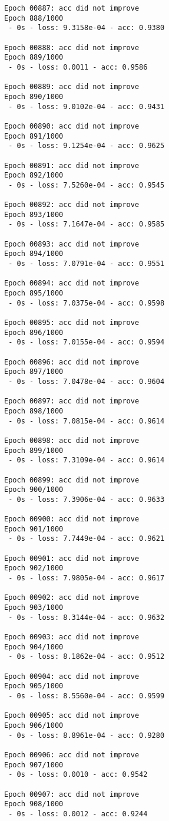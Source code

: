 \documentclass[11pt]{article}
\begin{document}
\begin{Verbatim}[commandchars=\\\{\}]
Epoch 00887: acc did not improve
Epoch 888/1000
 - 0s - loss: 9.3158e-04 - acc: 0.9380

Epoch 00888: acc did not improve
Epoch 889/1000
 - 0s - loss: 0.0011 - acc: 0.9586

Epoch 00889: acc did not improve
Epoch 890/1000
 - 0s - loss: 9.0102e-04 - acc: 0.9431

Epoch 00890: acc did not improve
Epoch 891/1000
 - 0s - loss: 9.1254e-04 - acc: 0.9625

Epoch 00891: acc did not improve
Epoch 892/1000
 - 0s - loss: 7.5260e-04 - acc: 0.9545

Epoch 00892: acc did not improve
Epoch 893/1000
 - 0s - loss: 7.1647e-04 - acc: 0.9585

Epoch 00893: acc did not improve
Epoch 894/1000
 - 0s - loss: 7.0791e-04 - acc: 0.9551

Epoch 00894: acc did not improve
Epoch 895/1000
 - 0s - loss: 7.0375e-04 - acc: 0.9598

Epoch 00895: acc did not improve
Epoch 896/1000
 - 0s - loss: 7.0155e-04 - acc: 0.9594

Epoch 00896: acc did not improve
Epoch 897/1000
 - 0s - loss: 7.0478e-04 - acc: 0.9604

Epoch 00897: acc did not improve
Epoch 898/1000
 - 0s - loss: 7.0815e-04 - acc: 0.9614

Epoch 00898: acc did not improve
Epoch 899/1000
 - 0s - loss: 7.3109e-04 - acc: 0.9614

Epoch 00899: acc did not improve
Epoch 900/1000
 - 0s - loss: 7.3906e-04 - acc: 0.9633

Epoch 00900: acc did not improve
Epoch 901/1000
 - 0s - loss: 7.7449e-04 - acc: 0.9621

Epoch 00901: acc did not improve
Epoch 902/1000
 - 0s - loss: 7.9805e-04 - acc: 0.9617

Epoch 00902: acc did not improve
Epoch 903/1000
 - 0s - loss: 8.3144e-04 - acc: 0.9632

Epoch 00903: acc did not improve
Epoch 904/1000
 - 0s - loss: 8.1862e-04 - acc: 0.9512

Epoch 00904: acc did not improve
Epoch 905/1000
 - 0s - loss: 8.5560e-04 - acc: 0.9599

Epoch 00905: acc did not improve
Epoch 906/1000
 - 0s - loss: 8.8961e-04 - acc: 0.9280

Epoch 00906: acc did not improve
Epoch 907/1000
 - 0s - loss: 0.0010 - acc: 0.9542

Epoch 00907: acc did not improve
Epoch 908/1000
 - 0s - loss: 0.0012 - acc: 0.9244


\end{Verbatim}
\end{document}
